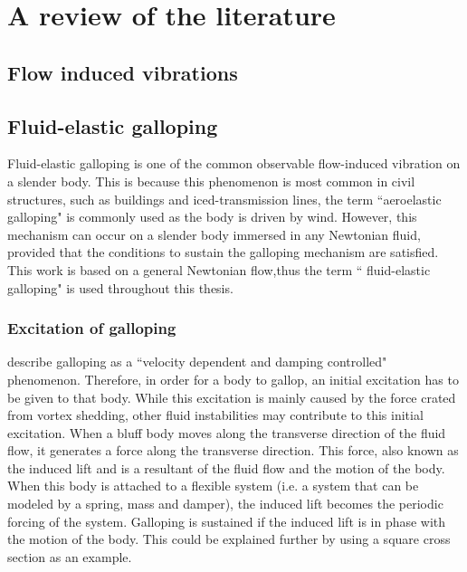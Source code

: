 \chapter{A review of the literature}
\label{chap:lit-review}
\section{Flow induced vibrations}
\label{sec:flow induced vibrations}


\section{Fluid-elastic galloping}
\label{fluid-elastic galloping}

Fluid-elastic galloping is one of the common observable flow-induced vibration on a slender body. This is because this phenomenon is most common in civil structures, such as buildings and iced-transmission lines, the term ``aeroelastic galloping" is commonly used as the body is driven by wind. However, this mechanism can occur on a slender body immersed in any Newtonian fluid, provided that the conditions to sustain the galloping mechanism are satisfied. This work is based on a general Newtonian flow,thus the term `` fluid-elastic galloping" is used throughout this thesis.
   

\subsection{Excitation of galloping}
\label{sec:exci-galloping}

\citet{Paidoussis2010} describe galloping as a ``velocity dependent and damping controlled" phenomenon. Therefore, in order for a body to gallop, an initial excitation has to be given to that body. While this excitation is mainly caused by the force crated from vortex shedding, other fluid instabilities may contribute to this initial excitation.  When a bluff body moves along the transverse direction of the fluid flow, it generates a force along the transverse direction. This force, also known as the induced lift and is a resultant of the fluid flow and the motion of the body. When this body is attached to a flexible system (i.e. a system that can be modeled by a spring, mass and damper), the induced lift becomes the periodic forcing of the system. Galloping is sustained  if the induced lift is in phase with the motion of the body. This could be explained further by using a square cross section as an example.

